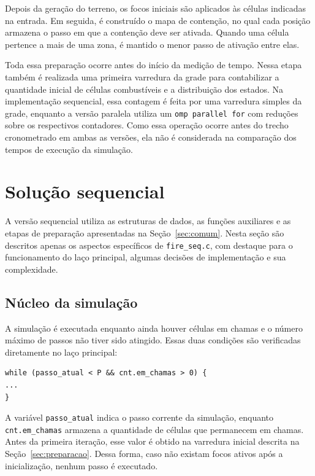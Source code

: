 \documentclass[11pt,a4paper]{article}
\begin{document}
Depois da geração do terreno, os focos iniciais são aplicados às células indicadas na entrada. Em seguida, é construído o mapa de contenção, no qual cada posição armazena o passo em que a contenção deve ser ativada. Quando uma célula pertence a mais de uma zona, é mantido o menor passo de ativação entre elas.

Toda essa preparação ocorre antes do início da medição de tempo. Nessa etapa também é realizada uma primeira varredura da grade para contabilizar a quantidade inicial de células combustíveis e a distribuição dos estados. Na implementação sequencial, essa contagem é feita por uma varredura simples da grade, enquanto a versão paralela utiliza um \texttt{omp parallel for} com reduções sobre os respectivos contadores. Como essa operação ocorre antes do trecho cronometrado em ambas as versões, ela não é considerada na comparação dos tempos de execução da simulação.

\section{Solução sequencial}
\label{sec:seq}

A versão sequencial utiliza as estruturas de dados, as funções auxiliares e as etapas de preparação apresentadas na Seção~\ref{sec:comum}. Nesta seção são descritos apenas os aspectos específicos de \texttt{fire\_seq.c}, com destaque para o funcionamento do laço principal, algumas decisões de implementação e sua complexidade.

\subsection{Núcleo da simulação}

A simulação é executada enquanto ainda houver células em chamas e o número máximo de passos não tiver sido atingido. Essas duas condições são verificadas diretamente no laço principal:

\begin{lstlisting}
while (passo_atual < P && cnt.em_chamas > 0) {
...
}
\end{lstlisting}

A variável \texttt{passo\_atual} indica o passo corrente da simulação, enquanto \texttt{cnt.em\_chamas} armazena a quantidade de células que permanecem em chamas. Antes da primeira iteração, esse valor é obtido na varredura inicial descrita na Seção~\ref{sec:preparacao}. Dessa forma, caso não existam focos ativos após a inicialização, nenhum passo é executado.
\end{document}
